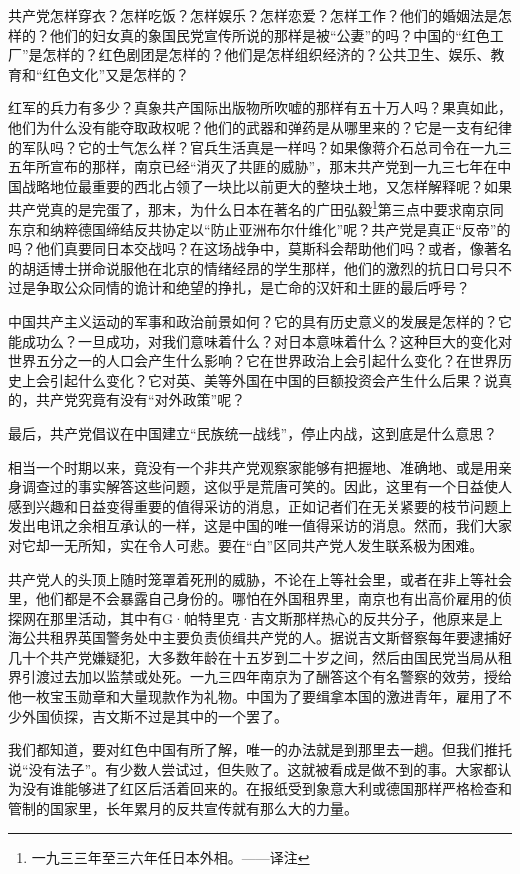 \documentclass[10pt]{book}
\begin{document}
共产党怎样穿衣？怎样吃饭？怎样娱乐？怎样恋爱？怎样工作？他们的婚姻法是怎样的？他们的妇女真的象国民党宣传所说的那样是被“公妻”的吗？中国的“红色工厂”是怎样的？红色剧团是怎样的？他们是怎样组织经济的？公共卫生、娱乐、教育和“红色文化”又是怎样的？

红军的兵力有多少？真象共产国际出版物所吹嘘的那样有五十万人吗？果真如此，他们为什么没有能夺取政权呢？他们的武器和弹药是从哪里来的？它是一支有纪律的军队吗？它的士气怎么样？官兵生活真是一样吗？如果像蒋介石总司令在一九三五年所宣布的那样，南京已经“消灭了共匪的威胁”，那末共产党到一九三七年在中国战略地位最重要的西北占领了一块比以前更大的整块土地，又怎样解释呢？如果共产党真的是完蛋了，那末，为什么日本在著名的广田弘毅\footnote{一九三三年至三六年任日本外相。——译注}第三点中要求南京同东京和纳粹德国缔结反共协定以“防止亚洲布尔什维化”呢？共产党是真正“反帝”的吗？他们真要同日本交战吗？在这场战争中，莫斯科会帮助他们吗？或者，像著名的胡适博士拼命说服他在北京的情绪经昂的学生那样，他们的激烈的抗日口号只不过是争取公众同情的诡计和绝望的挣扎，是亡命的汉奸和土匪的最后呼号？

中国共产主义运动的军事和政治前景如何？它的具有历史意义的发展是怎样的？它能成功么？一旦成功，对我们意味着什么？对日本意味着什么？这种巨大的变化对世界五分之一的人口会产生什么影响？它在世界政治上会引起什么变化？在世界历史上会引起什么变化？它对英、美等外国在中国的巨额投资会产生什么后果？说真的，共产党究竟有没有“对外政策”呢？

最后，共产党倡议在中国建立“民族统一战线”，停止内战，这到底是什么意思？

相当一个时期以来，竟没有一个非共产党观察家能够有把握地、准确地、或是用亲身调查过的事实解答这些问题，这似乎是荒唐可笑的。因此，这里有一个日益使人感到兴趣和日益变得重要的值得采访的消息，正如记者们在无关紧要的枝节问题上发出电讯之余相互承认的一样，这是中国的唯一值得采访的消息。然而，我们大家对它却一无所知，实在令人可悲。要在“白”区同共产党人发生联系极为困难。

共产党人的头顶上随时笼罩着死刑的威胁，不论在上等社会里，或者在非上等社会里，他们都是不会暴露自己身份的。哪怕在外国租界里，南京也有出高价雇用的侦探网在那里活动，其中有G·帕特里克·吉文斯那样热心的反共分子，他原来是上海公共租界英国警务处中主要负责侦缉共产党的人。据说吉文斯督察每年要逮捕好几十个共产党嫌疑犯，大多数年龄在十五岁到二十岁之间，然后由国民党当局从租界引渡过去加以监禁或处死。一九三四年南京为了酬答这个有名警察的效劳，授给他一枚宝玉勋章和大量现款作为礼物。中国为了要缉拿本国的激进青年，雇用了不少外国侦探，吉文斯不过是其中的一个罢了。

我们都知道，要对红色中国有所了解，唯一的办法就是到那里去一趟。但我们推托说“没有法子”。有少数人尝试过，但失败了。这就被看成是做不到的事。大家都认为没有谁能够进了红区后活着回来的。在报纸受到象意大利或德国那样严格检查和管制的国家里，长年累月的反共宣传就有那么大的力量。
\end{document}
